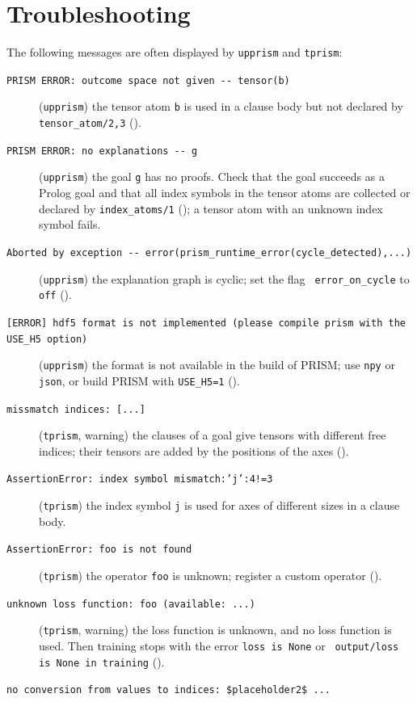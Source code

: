 \documentclass[a4paper]{report}
\begin{document}
\section{Troubleshooting}
\label{sec:troubleshooting}

The following messages are often displayed by {\tt upprism} and {\tt tprism}:
\begin{description}
	\item[{\tt PRISM ERROR: outcome space not given -{}- tensor(b)}]
	({\tt upprism}) the tensor atom {\tt b} is used in a clause body but not
	declared by {\tt tensor\_atom/2,3} ().
	\item[{\tt PRISM ERROR: no explanations -{}- g}]
	({\tt upprism}) the goal {\tt g} has no proofs.  Check that the goal
	succeeds as a Prolog goal and that all index symbols in the tensor atoms are
	collected or declared by {\tt index\_atoms/1} (); a
	tensor atom with an unknown index symbol fails.
	\item[{\tt Aborted by exception -{}- error(prism\_runtime\_error(cycle\_detected),...)}]
	({\tt upprism}) the explanation graph is cyclic; set the flag {\tt
		error\_on\_cycle} to {\tt off} ().
	\item[{\tt [ERROR] hdf5 format is not implemented (please compile prism with the USE\_H5 option)}]
	({\tt upprism}) the format is not available in the build of PRISM; use
	{\tt npy} or {\tt json}, or build PRISM with {\tt USE\_H5=1} ().
	\item[{\tt missmatch indices: [...]}]
	({\tt tprism}, warning) the clauses of a goal give tensors with different
	free indices; their tensors are added by the positions of the axes
	().
	\item[{\tt AssertionError: index symbol mismatch:'j':4!=3}]
	({\tt tprism}) the index symbol {\tt j} is used for axes of different sizes
	in a clause body.
	\item[{\tt AssertionError: foo is not found}]
	({\tt tprism}) the operator {\tt foo} is unknown; register a custom operator
	().
	\item[{\tt unknown loss function: foo (available: ...)}]
	({\tt tprism}, warning) the loss function is unknown, and no loss function is
	used.  Then training stops with the error {\tt loss is None} or {\tt
		output/loss is None in training} ().
	\item[{\tt no conversion from values to indices: \$placeholder2\$ ...}]

\end{description}
\end{document}
